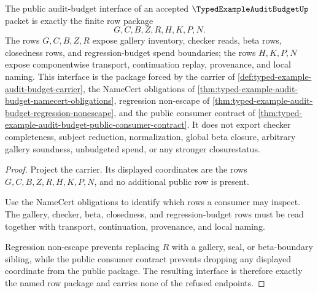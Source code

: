 \begin{theorem}
\label{thm:typed-example-audit-budget-public-interface}
The public audit-budget interface of an accepted $\TypedExampleAuditBudgetUp$ packet is exactly the finite row package
$$
G,C,B,Z,R,H,K,P,N .
$$
The rows $G,C,B,Z,R$ expose gallery inventory, checker reads, beta rows, closedness rows, and regression-budget spend boundaries; the rows $H,K,P,N$ expose componentwise transport, continuation replay, provenance, and local naming. This interface is the package forced by the carrier of \autoref{def:typed-example-audit-budget-carrier}, the NameCert obligations of \autoref{thm:typed-example-audit-budget-namecert-obligations}, regression non-escape of \autoref{thm:typed-example-audit-budget-regression-nonescape}, and the public consumer contract of \autoref{thm:typed-example-audit-budget-public-consumer-contract}. It does not export checker completeness, subject reduction, normalization, global beta closure, arbitrary gallery soundness, unbudgeted spend, or any stronger closurestatus.
\end{theorem}
\begin{proof}
Project the carrier. Its displayed coordinates are the rows $G,C,B,Z,R,H,K,P,N$, and no additional public row is present.

Use the NameCert obligations to identify which rows a consumer may inspect. The gallery, checker, beta, closedness, and regression-budget rows must be read together with transport, continuation, provenance, and local naming.

Regression non-escape prevents replacing $R$ with a gallery, seal, or beta-boundary sibling, while the public consumer contract prevents dropping any displayed coordinate from the public package. The resulting interface is therefore exactly the named row package and carries none of the refused endpoints.
\end{proof}

